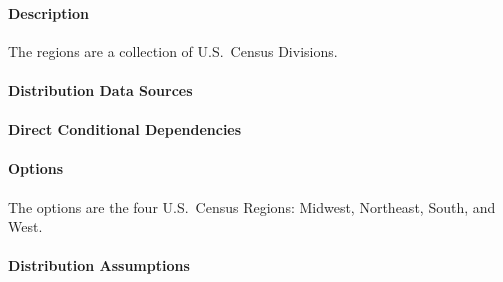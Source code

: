 \paragraph{Description}

The regions are a collection of U.S.~Census Divisions.

\paragraph{Distribution Data Sources}


\paragraph{Direct Conditional Dependencies}


\paragraph{Options}
The options are the four U.S.~Census Regions: Midwest, Northeast, South, and West.

\paragraph{Distribution Assumptions}

